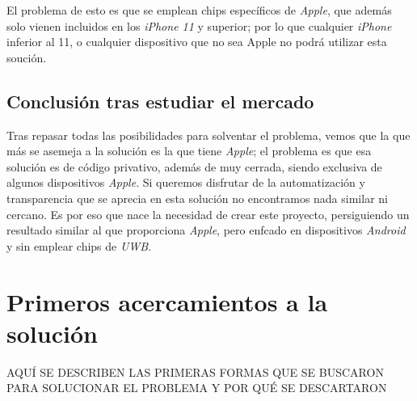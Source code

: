 El problema de esto es que se emplean chips específicos de \emph{Apple}, que
además solo vienen incluidos en los \emph{iPhone 11} y superior; por lo que
cualquier \emph{iPhone} inferior al 11, o cualquier dispositivo que no sea Apple
no podrá utilizar esta soución.

\subsection{Conclusión tras estudiar el mercado}
Tras repasar todas las posibilidades para solventar el problema, vemos que la
que más se asemeja a la solución es la que tiene \emph{Apple}; el problema es
que esa solución es de código privativo, además de muy cerrada, siendo exclusiva
de algunos dispositivos \emph{Apple}. Si queremos disfrutar de la automatización
y transparencia que se aprecia en esta solución no encontramos nada similar ni
cercano. Es por eso que nace la necesidad de crear este proyecto, persiguiendo
un resultado similar al que proporciona \emph{Apple}, pero enfcado en
dispositivos \emph{Android} y sin emplear chips de \emph{UWB}.\\

\section{Primeros acercamientos a la solución}

AQUÍ SE DESCRIBEN LAS PRIMERAS FORMAS QUE SE BUSCARON PARA SOLUCIONAR EL PROBLEMA Y POR QUÉ SE DESCARTARON